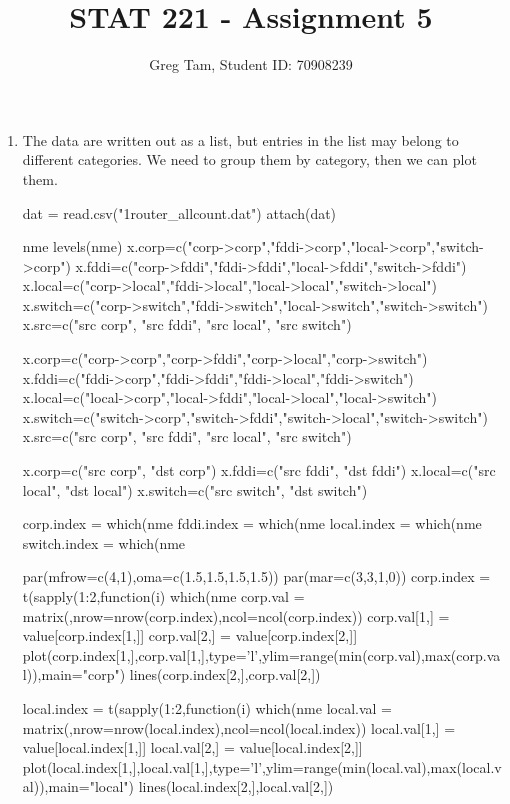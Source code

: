 \documentclass[letterpaper,10pt]{amsart}
\newenvironment{verbatimcode}{\bigskip \scriptsize \verbatim}{\endverbatim \normalsize \bigskip}
\begin{document}
\title{STAT 221 - Assignment 5}
\author{Greg Tam, Student ID: 70908239}
\date{}
\maketitle


\begin{enumerate}[{1}.1]
\item 
The data are written out as a list, but entries in the list may belong to different categories. We need to group them by category, then we can plot them. 

\begin{verbatimcode}
dat = read.csv("1router_allcount.dat")
attach(dat)

nme
levels(nme)
x.corp=c("corp->corp","fddi->corp","local->corp","switch->corp")
x.fddi=c("corp->fddi","fddi->fddi","local->fddi","switch->fddi")
x.local=c("corp->local","fddi->local","local->local","switch->local")
x.switch=c("corp->switch","fddi->switch","local->switch","switch->switch")
x.src=c("src corp", "src fddi", "src local", "src switch")


x.corp=c("corp->corp","corp->fddi","corp->local","corp->switch")
x.fddi=c("fddi->corp","fddi->fddi","fddi->local","fddi->switch")
x.local=c("local->corp","local->fddi","local->local","local->switch")
x.switch=c("switch->corp","switch->fddi","switch->local","switch->switch")
x.src=c("src corp", "src fddi", "src local", "src switch")

x.corp=c("src corp", "dst corp")
x.fddi=c("src fddi", "dst fddi")
x.local=c("src local", "dst local")
x.switch=c("src switch", "dst switch")


corp.index = which(nme %
fddi.index = which(nme %
local.index = which(nme %
switch.index = which(nme %

par(mfrow=c(4,1),oma=c(1.5,1.5,1.5,1.5))
par(mar=c(3,3,1,0))
corp.index = t(sapply(1:2,function(i) which(nme %
corp.val = matrix(,nrow=nrow(corp.index),ncol=ncol(corp.index))
corp.val[1,] = value[corp.index[1,]]
corp.val[2,] = value[corp.index[2,]]
plot(corp.index[1,],corp.val[1,],type='l',ylim=range(min(corp.val),max(corp.val)),main="corp")
lines(corp.index[2,],corp.val[2,])

local.index = t(sapply(1:2,function(i) which(nme %
local.val = matrix(,nrow=nrow(local.index),ncol=ncol(local.index))
local.val[1,] = value[local.index[1,]]
local.val[2,] = value[local.index[2,]]
plot(local.index[1,],local.val[1,],type='l',ylim=range(min(local.val),max(local.val)),main="local")
lines(local.index[2,],local.val[2,])


\end{verbatimcode}
\end{enumerate}
\end{document}
